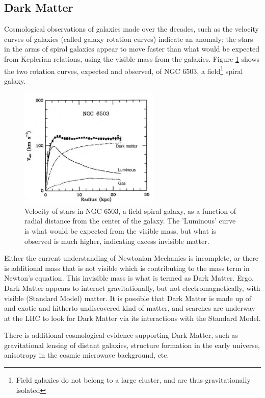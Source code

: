 \documentclass[12pt,a4paper,openright,twoside]{report}
\begin{document}
\subsection{Dark Matter}
Cosmological observations of galaxies made over the decades, such as the velocity curves of galaxies (called galaxy rotation curves) indicate an anomaly; the stars in the arms of spiral galaxies appear to move faster than what would be expected from Keplerian relations, using the visible mass from the galaxies. Figure \ref{fig:grc} shows the two rotation curves, expected and observed, of NGC 6503, a field\footnote{Field galaxies do not belong to a large cluster, and are thus gravitationally isolated}  spiral galaxy.\cite{galaxy}
\begin{figure}[H]
\centering
	\includegraphics[width=0.6\textwidth]{GRC.jpeg}
	\caption{Velocity of stars in NGC 6503, a field spiral galaxy, as a function of radial distance from the center of the galaxy\cite{galaxy}. The 'Luminous' curve is what would be expected from the visible mass, but what is observed is much higher, indicating excess invisible matter.}
	\label{fig:grc}
\end{figure}
Either the current understanding of Newtonian Mechanics is incomplete, or there is additional mass that is not visible which is contributing to the mass term in Newton's equation. This invisible mass is what is termed as Dark Matter. Ergo, Dark Matter appears to interact gravitationally, but not electromagnetically, with visible (Standard Model) matter. It is possible that Dark Matter is made up of and exotic and hitherto undiscovered kind of matter, and searches are underway at the LHC to look for Dark Matter via its interactions with the Standard Model.

There is additional cosmological evidence supporting Dark Matter, such as gravitational lensing of distant galaxies, structure formation in the early universe, anisotropy in the cosmic microwave background, etc.
\end{document}
